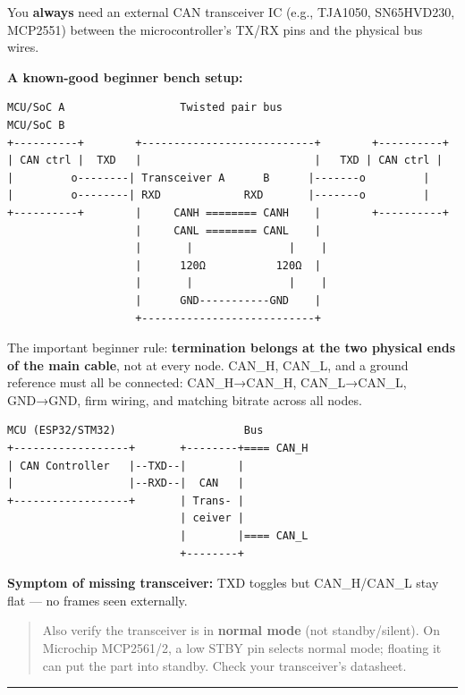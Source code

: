 \documentclass[12pt,a4paper,oneside]{report}
\begin{document}
You \textbf{always} need an external CAN transceiver IC (e.g., TJA1050,
SN65HVD230, MCP2551) between the microcontroller's TX/RX pins and the physical
bus wires.

\textbf{A known-good beginner bench setup:}

\begin{verbatim}
MCU/SoC A                  Twisted pair bus                     MCU/SoC B
+----------+        +---------------------------+        +----------+
| CAN ctrl |  TXD   |                           |   TXD | CAN ctrl |
|         o--------| Transceiver A      B      |-------o         |
|         o--------| RXD             RXD       |-------o         |
+----------+        |     CANH ======== CANH    |        +----------+
                    |     CANL ======== CANL    |
                    |       |               |    |
                    |      120Ω           120Ω  |
                    |       |               |    |
                    |      GND-----------GND    |
                    +---------------------------+
\end{verbatim}

The important beginner rule: \textbf{termination belongs at the two physical
ends of the main cable}, not at every node. CAN\_H, CAN\_L, and a ground
reference must all be connected: CAN\_H→CAN\_H, CAN\_L→CAN\_L, GND→GND, firm
wiring, and matching bitrate across all nodes.

\begin{verbatim}
MCU (ESP32/STM32)                    Bus
+------------------+       +--------+==== CAN_H
| CAN Controller   |--TXD--|        |
|                  |--RXD--|  CAN   |
+------------------+       | Trans- |
                           | ceiver |
                           |        |==== CAN_L
                           +--------+
\end{verbatim}

\textbf{Symptom of missing transceiver:} TXD toggles but CAN\_H/CAN\_L stay flat
--- no frames seen externally.

\begin{quote}
Also verify the transceiver is in \textbf{normal mode} (not standby/silent). On
Microchip MCP2561/2, a low STBY pin selects normal mode; floating it can put the
part into standby. Check your transceiver's datasheet.
\end{quote}

\begin{center}\rule{0.5\linewidth}{0.5pt}\end{center}
\end{document}

